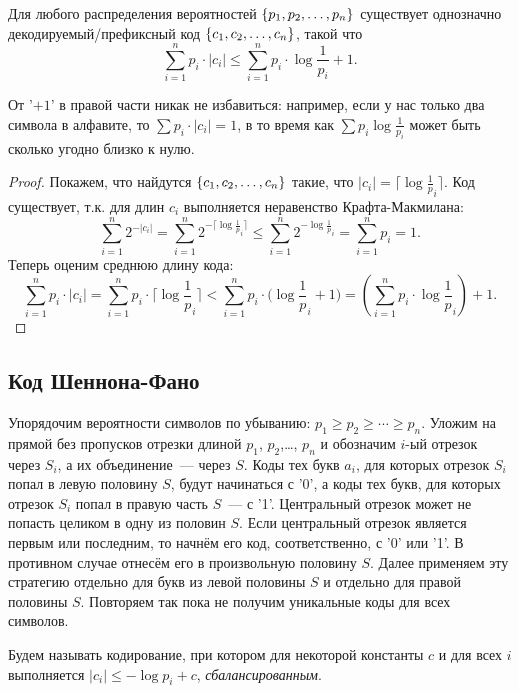 \documentclass[12pt]{article}
\begin{document}
\begin{theorem}[Шеннон]\label{thm:shannon:optcode}
    Для любого распределения вероятностей $\{{p}_1,{p}_2,\dotsc,{p}_{n}\}$ существует
    однозначно декодируемый/префиксный код $\{{c}_1,{c}_2,\dotsc,{c}_{n}\}$, такой что
    \[
        \sum_{i=1}^n p_i\cdot|c_i|\le \sum_{i=1}^n p_i\cdot \log\frac1{p_i} + 1. 
    \]
\end{theorem}
\begin{remark}
    От '$+1$' в правой части никак не избавиться: например, если у нас только два символа в
    алфавите, то $\sum p_i\cdot|c_i| = 1$, в то время как $\sum
    p_i\log\frac{1}{p_i}$ может быть сколько угодно близко к нулю.
\end{remark}

\begin{proof}
    Покажем, что найдутся \(\{{c}_1,{c}_2,\dotsc,{c}_{n}\}\) такие, что $|c_i| =
    \bigl\lceil\log\frac1p_i \bigr\rceil$. Код существует, т.к. для длин $c_i$ выполняется
    неравенство Крафта-Макмилана:
    \[
        \sum_{i=1}^n 2^{-|c_i|} =  
        \sum_{i=1}^n 2^{-\lceil\log\frac1p_i \rceil} \le  
        \sum_{i=1}^n 2^{-\log\frac1p_i} = 
        \sum_{i=1}^n p_i = 1. 
    \]
    Теперь оценим среднюю длину кода:
    \[
        \sum_{i=1}^n p_i\cdot |c_i| =  
        \sum_{i=1}^n p_i\cdot \bigl\lceil\log{\textstyle\frac1p_i} \bigr\rceil < 
        \sum_{i=1}^n p_i\cdot \bigl(\log{\textstyle\frac1p_i} + 1\bigr) =
        \left(\sum_{i=1}^n p_i\cdot \log{\textstyle\frac1p_i}\right) + 1.
    \]
\end{proof}
\subsection{Код Шеннона-Фано}
Упорядочим вероятности символов по убыванию: $p_1\ge p_2\ge\dotsb\ge p_n$.
Уложим на прямой без пропусков отрезки длиной $p_1$, $p_2$,\ldots, $p_n$
и обозначим $i$-ый отрезок через $S_i$, а их объединение~--- через $S$.
Коды тех букв $a_i$, для которых отрезок $S_i$ попал в левую половину $S$,
будут начинаться с '0', а коды тех букв, для которых отрезок $S_i$ попал
в правую часть $S$~--- с '1'. Центральный отрезок может не попасть
целиком в одну из половин $S$. Если центральный отрезок является первым
или последним, то начнём его код, соответственно, с '0' или '1'.
В противном случае отнесём его в произвольную половину $S$. Далее
применяем эту стратегию отдельно для букв из левой половины $S$ и отдельно для
правой половины $S$. Повторяем так пока не получим уникальные коды для всех
символов.     

\begin{definition}
    Будем называть кодирование, при котором для некоторой константы $c$ и для
    всех $i$ выполняется $|c_i|\le - \log p_i + c$, \emph{сбалансированным}.
\end{definition}
\end{document}
